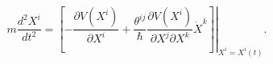 \begin{equation}
m\frac{d^{2}X^{i}}{dt^{2}}=\left.  \left[  -\frac{\partial V\left(
X^{i}\right)  }{\partial X^{i}}+\frac{\theta^{ij}}{\hbar}\frac{\partial
V\left(  X^{i}\right)  }{\partial X^{j}\partial X^{k}}\dot{X}^{k}\right]
\right|  _{X^{i}=X^{i}(t)}.\label{33.3}%
\end{equation}

